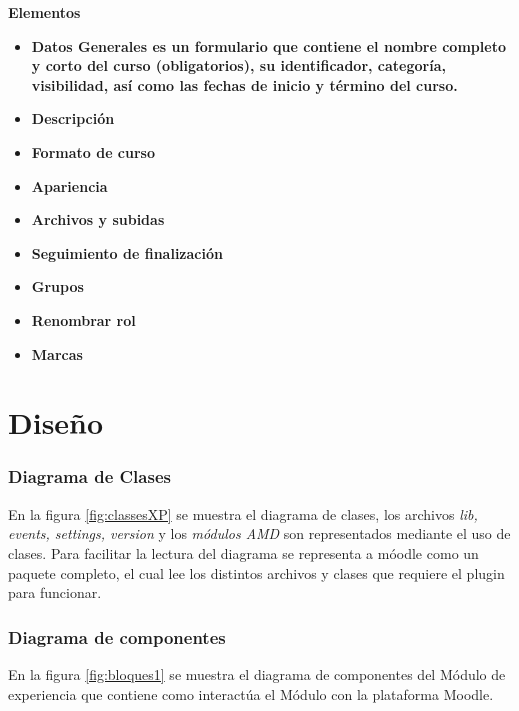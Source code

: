     {\bf Elementos}
    \begin{itemize}
        \item \bf{Datos Generales} es un formulario que contiene el nombre completo y corto del curso (obligatorios), su identificador, categoría, visibilidad, así como las fechas de inicio y término del curso.
        \item \bf{Descripción} 
        \item \bf{Formato de curso} 
        \item \bf{Apariencia}
        \item \bf{Archivos y subidas}
        \item \bf{Seguimiento de finalización}
        \item \bf{Grupos}
        \item \bf{Renombrar rol}
        \item \bf{Marcas}
    \end{itemize}

        
\chapter{Diseño}

\subsection{Diagrama de Clases}
    
    En la figura \ref{fig:classesXP} se muestra el diagrama de clases, los archivos {\it lib, events, settings, version} y los {\it módulos AMD} son representados mediante el uso de clases. Para facilitar la lectura del diagrama se representa a móodle como un paquete completo, el cual lee los distintos archivos y clases que requiere el plugin para funcionar.

\clearpage

\subsection{Diagrama de componentes}

    En la figura \ref{fig:bloques1} se muestra el diagrama de componentes del Módulo de experiencia que contiene como interactúa el Módulo con la plataforma Moodle.


